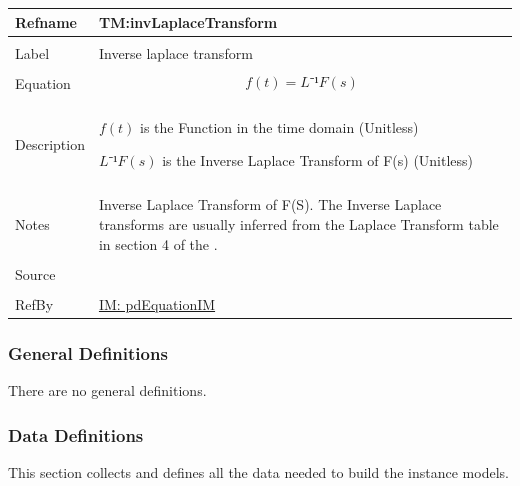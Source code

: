 \documentclass[12pt]{article}
\begin{document}
\begin{minipage}{\textwidth}
\begin{tabular}{>{\raggedright}p{}>{\raggedright\arraybackslash}p{}}
\toprule \textbf{Refname} & \textbf{TM:invLaplaceTransform}
\label{TM:invLaplaceTransform}
\\ \midrule \\
Label & Inverse laplace transform
        
\\ \midrule \\
Equation & \begin{displaymath}
           f(t)=L⁻¹{F(s)}
           \end{displaymath}
\\ \midrule \\
Description & \begin{symbDescription}
              \item{$f(t)$ is the Function in the time domain (Unitless)}
              \item{$L⁻¹{F(s)}$ is the Inverse Laplace Transform of F(s) (Unitless)}
              \end{symbDescription}
\\ \midrule \\
Notes & Inverse Laplace Transform of F(S). The Inverse Laplace transforms are  usually inferred from the Laplace Transform table in   section 4 of the  \cite{laplaceWiki}.
        
\\ \midrule \\
Source & \cite{laplaceWiki}
         
\\ \midrule \\
RefBy & \hyperref[IM:pdEquationIM]{IM: pdEquationIM}
        
\\ \bottomrule
\end{tabular}
\end{minipage}
\subsubsection{General Definitions}
\label{Sec:GDs}
There are no general definitions.

\subsubsection{Data Definitions}
\label{Sec:DDs}
This section collects and defines all the data needed to build the instance models.
\end{document}
